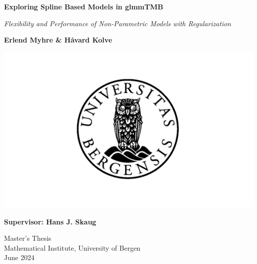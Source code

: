 \documentclass[12pt, twoside,hidelinks]{article}
\theoremstyle{definition}
\numberwithin{equation}{section}
\begin{document}
	
	
	\begin{titlepage}
		\begin{center}
			\vspace*{1cm}
			
			
			\textbf{\Huge Exploring Spline Based Models in glmmTMB}
			
			\vspace{0.5cm}
			
			\textit{\Large Flexibility and Performance of Non-Parametric Models with Regularization}
			
	       
            \vspace{1.0cm}
            \large
            \textbf{Erlend Myhre \& Håvard Kolve}


            \vfill


            \vspace{0.8cm}

            \includegraphics[width=1\textwidth]{visuals/university.jpg}
            
            \vspace{0.8cm}
    
            \Large
            \textbf{Supervisor: Hans J. Skaug}
    
            \vspace{0.5cm}
    
            \large
            Master's Thesis\\
            Mathematical Institute, University of Bergen\\
            
            \small June 2024

        \end{center}
    \end{titlepage}
	
\end{document}
